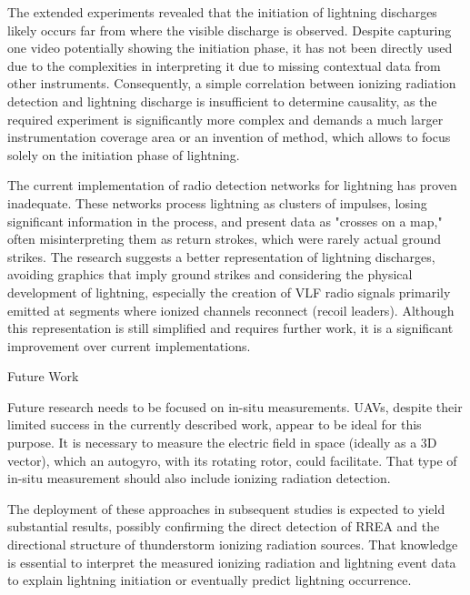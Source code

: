 The extended experiments revealed that the initiation of lightning discharges likely occurs far from where the visible discharge is observed. Despite capturing one video potentially showing the initiation phase, it has not been directly used due to the complexities in interpreting it due to missing contextual data from other instruments. Consequently, a simple correlation between ionizing radiation detection and lightning discharge is insufficient to determine causality, as the required experiment is significantly more complex and demands a much larger instrumentation coverage area or an invention of method, which allows to focus solely on the initiation phase of lightning.

The current implementation of radio detection networks for lightning has proven inadequate. These networks process lightning as clusters of impulses, losing significant information in the process, and present data as "crosses on a map," often misinterpreting them as return strokes, which were rarely actual ground strikes. The research suggests a better representation of lightning discharges, avoiding graphics that imply ground strikes and considering the physical development of lightning, especially the creation of VLF radio signals primarily emitted at segments where ionized channels reconnect (recoil leaders). Although this representation is still simplified and requires further work, it is a significant improvement over current implementations.

\sec Future Work

Future research needs to be  focused on in-situ measurements. UAVs, despite their limited success in the currently described work, appear to be ideal for this purpose. It is necessary to measure the electric field in space (ideally as a 3D vector), which an autogyro, with its rotating rotor, could facilitate. That type of in-situ measurement should also include ionizing radiation detection.

The deployment of these approaches in subsequent studies is expected to yield substantial results, possibly confirming the direct detection of RREA and the directional structure of thunderstorm ionizing  radiation sources. That knowledge is essential to interpret the measured ionizing radiation and lightning event data to explain lightning initiation or eventually predict lightning occurrence. 

